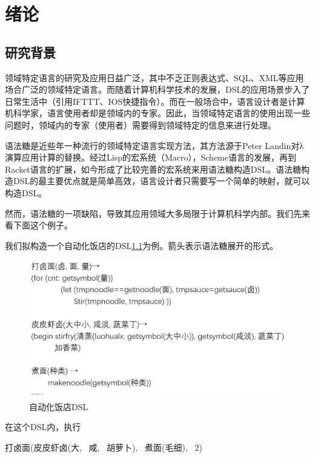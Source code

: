 \pagestyle{fancy}
\normalsize
\linespread{1.5}\selectfont
\chapter{绪论}

\section{研究背景}
领域特定语言的研究及应用日益广泛，其中不乏正则表达式\cite{regexp}、SQL\cite{sql}、XML\cite{xml}等应用场合广泛的领域特定语言。而随着计算机科学技术的发展，DSL的应用场景步入了日常生活中（引用IFTTT、IOS快捷指令）。而在一般场合中，语言设计者是计算机科学家，语言使用者却是领域内的专家。因此，当领域特定语言的使用出现一些问题时，领域内的专家（使用者）需要得到领域特定的信息来进行处理。

语法糖是近些年一种流行的领域特定语言实现方法，其方法源于Peter Landin对λ演算应用计算的替换\cite{landin}。经过Lisp的宏系统（Macro），Scheme语言的发展，再到Racket语言的扩展\cite{frommacro}，如今形成了比较完善的宏系统来用语法糖构造DSL。语法糖构造DSL的最主要优点就是简单高效，语言设计者只需要写一个简单的映射，就可以构造DSL。

然而，语法糖的一项缺陷，导致其应用领域大多局限于计算机科学内部。我们先来看下面这个例子。

	我们拟构造一个自动化饭店的DSL\ref{fig:restaurant}为例。箭头表示语法糖展开的形式。
	
	\begin{figure}[ht]
		\centering
		\includegraphics[width=12cm]{images/chapter1/restaurant.png}
		\caption{自动化饭店DSL}
		\label{fig:restaurant}
	\end{figure}

在这个DSL内，执行

\begin{flushleft}
	打卤面(皮皮虾卤(大,~ 咸,~ 胡萝卜),~ 煮面(毛细),~ 2)
\end{flushleft}


